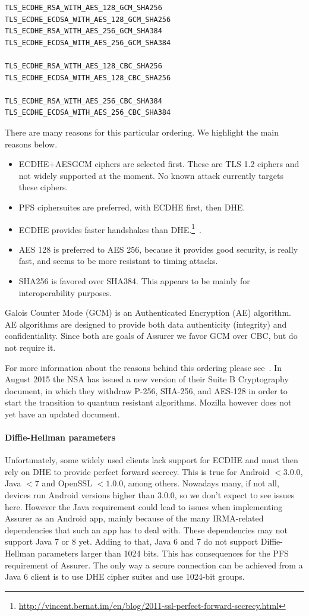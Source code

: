 \begin{verbatim}
TLS_ECDHE_RSA_WITH_AES_128_GCM_SHA256
TLS_ECDHE_ECDSA_WITH_AES_128_GCM_SHA256
TLS_ECDHE_RSA_WITH_AES_256_GCM_SHA384
TLS_ECDHE_ECDSA_WITH_AES_256_GCM_SHA384

TLS_ECDHE_RSA_WITH_AES_128_CBC_SHA256
TLS_ECDHE_ECDSA_WITH_AES_128_CBC_SHA256

TLS_ECDHE_RSA_WITH_AES_256_CBC_SHA384
TLS_ECDHE_ECDSA_WITH_AES_256_CBC_SHA384
\end{verbatim}

There are many reasons for this particular ordering. We highlight the main reasons below. 

\begin{itemize}
  \item ECDHE+AESGCM ciphers are selected first. These are TLS 1.2 ciphers and not widely supported at the moment. No known attack currently targets these ciphers.
  \item PFS ciphersuites are preferred, with ECDHE first, then DHE.
	\item ECDHE provides faster handshakes than DHE.\footnote{\url{http://vincent.bernat.im/en/blog/2011-ssl-perfect-forward-secrecy.html}}~\cite{pfsprice}.
  \item AES 128 is preferred to AES 256, because it provides good security, is really fast, and seems to be more resistant to timing attacks.
  \item SHA256 is favored over SHA384. This appears to be mainly for interoperability purposes.
\end{itemize}

Galois Counter Mode (GCM) is an Authenticated Encryption (AE) algorithm. AE algorithms are designed to provide both data authenticity (integrity) and confidentiality. Since both are goals of Assurer we favor GCM over CBC, but do not require it.

For more information about the reasons behind this ordering please see~\cite{mozilla}. In August 2015 the NSA has issued a new version of their Suite B Cryptography document, in which they withdraw P-256, SHA-256, and AES-128 in order to start the transition to quantum resistant algorithms. Mozilla however does not yet have an updated document.

\paragraph{Diffie-Hellman parameters}
Unfortunately, some widely used clients lack support for ECDHE and must then rely on DHE to provide perfect forward secrecy. This is true for Android $< 3.0.0$, Java $< 7$ and OpenSSL $< 1.0.0$, among others. Nowadays many, if not all, devices run Android versions higher than 3.0.0, so we don't expect to see issues here. However the Java requirement could lead to issues when implementing Assurer as an Android app, mainly because of the many IRMA-related dependencies that such an app has to deal with. These dependencies may not support Java 7 or 8 yet. Adding to that, Java 6 and 7 do not support Diffie-Hellman parameters larger than 1024 bits. This has consequences for the PFS requirement of Assurer. The only way a secure connection can be achieved from a Java 6 client is to use DHE cipher suites and use 1024-bit groups.

